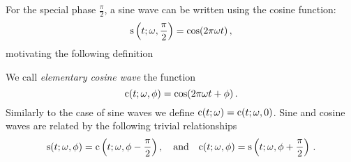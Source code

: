 For the special phase $\frac{\pi}{2}$, a sine wave can be written using the cosine
function:
\begin{equation}
  \mathrm{s}\left(t;\omega,\frac{\pi}{2}\right)= \cos(2\pi\omega t)\,,
\end{equation}
motivating the following definition
\begin{definition}
  We call \emph{elementary cosine wave} the function
  \begin{equation}
    \mathrm{c}(t;\omega,\phi)=\cos(2\pi\omega t + \phi)\,.\label{eq:cosine-wave}
  \end{equation}
  Similarly to the case of sine waves we define $\mathrm{c}(t;\omega)=\mathrm{c}(t;\omega,0)$. Sine and
  cosine waves are related by the following trivial relationships
  \begin{equation}
    \mathrm{s}(t;\omega,\phi)=\mathrm{c}\left(t;\omega,\phi-\frac{\pi}{2}\right),
    \quad\text{and}\quad
    \mathrm{c}(t;\omega,\phi)=\mathrm{s}\left(t;\omega,\phi+\frac{\pi}{2}\right)\,.
  \end{equation}
\end{definition}

